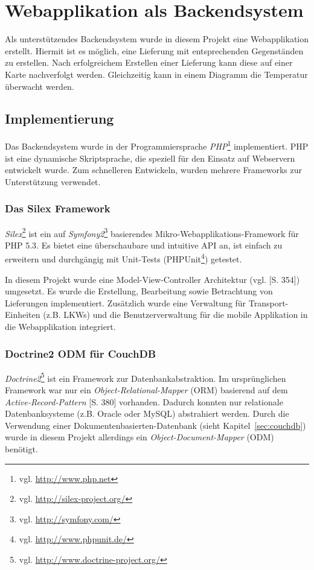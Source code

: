 \section{Webapplikation als Backendsystem}
\label{sec:webapplication}

Als unterstützendes Backendsystem wurde in diesem Projekt eine Webapplikation
	erstellt. Hiermit ist es möglich, eine Lieferung mit entsprechenden
	Gegenständen zu erstellen. Nach erfolgreichem Erstellen einer Lieferung
	kann diese auf einer Karte nachverfolgt werden. Gleichzeitig kann in
	einem Diagramm die Temperatur überwacht werden.

\subsection{Implementierung}

Das Backendsystem wurde in der Programmiersprache \emph{PHP}\footnote{vgl.
	\url{http://www.php.net}} implementiert. PHP ist eine dynamische
	Skriptsprache, die speziell für den Einsatz auf Webservern entwickelt
	wurde. Zum schnelleren Entwickeln, wurden mehrere Frameworks zur
	Unterstützung verwendet.
	
\subsubsection{Das Silex Framework}
\emph{Silex}\footnote{vgl. \url{http://silex-project.org/}} ist ein auf
	\emph{Symfony2}\footnote{vgl. \url{http://symfony.com/}} basierendes
	Mikro-Webapplikations-Framework für PHP 5.3. Es bietet eine überschaubare
	und intuitive API an, ist einfach zu erweitern und durchgängig mit
	Unit-Tests (PHPUnit\footnote{vgl. \url{http://www.phpunit.de/}}) getestet.
	
In diesem Projekt wurde eine Model-View-Controller Architektur (vgl.
	\cite{Schmidt09}[S. 354]) umgesetzt. Es wurde die Erstellung, Bearbeitung
	sowie Betrachtung von Lieferungen implementiert. Zusätzlich wurde eine
	Verwaltung für Transport-Einheiten (z.B. LKWs) und die Benutzerverwaltung
	für die mobile Applikation in die Webapplikation integriert.
		
\subsubsection{Doctrine2 ODM für CouchDB}
\emph{Doctrine2}\footnote{vgl. \url{http://www.doctrine-project.org/}} ist ein
	Framework zur Datenbankabstraktion. Im ursprünglichen Framework war nur ein
	\emph{Object-Relational-Mapper} (ORM) basierend auf dem
	\emph{Active-Record-Pattern} \cite{Schmidt09}[S. 380] vorhanden. Dadurch
	konnten nur relationale	Datenbanksysteme (z.B. Oracle oder MySQL) abstrahiert
	werden. Durch die Verwendung einer Dokumentenbasierten-Datenbank (sieht
	Kapitel~\ref{sec:couchdb}) wurde in diesem Projekt allerdings ein
	\emph{Object-Document-Mapper} (ODM) benötigt.
	

